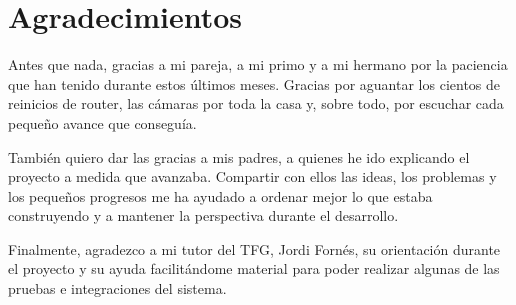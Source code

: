 \chapter*{Agradecimientos}

Antes que nada, gracias a mi pareja, a mi primo y a mi hermano por la paciencia
que han tenido durante estos últimos meses. Gracias por aguantar los cientos de
reinicios de router, las cámaras por toda la casa y, sobre todo, por escuchar
cada pequeño avance que conseguía.

También quiero dar las gracias a mis padres, a quienes he ido explicando el
proyecto a medida que avanzaba. Compartir con ellos las ideas, los problemas y
los pequeños progresos me ha ayudado a ordenar mejor lo que estaba construyendo
y a mantener la perspectiva durante el desarrollo.

Finalmente, agradezco a mi tutor del TFG, Jordi Fornés, su orientación durante
el proyecto y su ayuda facilitándome material para poder realizar algunas de
las pruebas e integraciones del sistema.
